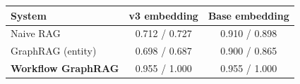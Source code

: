 \begin{tabular}{lcc}
\toprule
System & v3 embedding & Base embedding \\
\midrule
Naive RAG & 0.712 / 0.727 & 0.910 / 0.898 \\
GraphRAG (entity) & 0.698 / 0.687 & 0.900 / 0.865 \\
\textbf{Workflow GraphRAG} & 0.955 / 1.000 & 0.955 / 1.000 \\
\bottomrule
\end{tabular}
